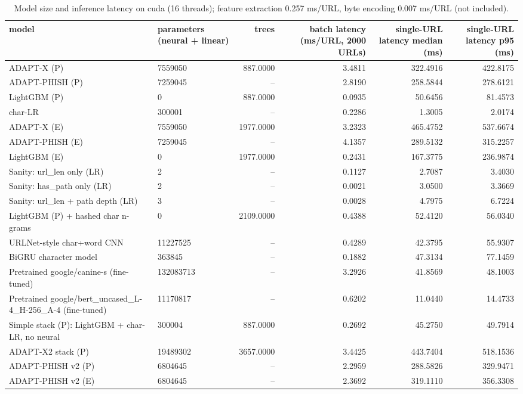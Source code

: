 \begin{table}[t]
\centering
\scriptsize
\caption{Model size and inference latency on cuda (16 threads); feature extraction 0.257 ms/URL, byte encoding 0.007 ms/URL (not included).}
\label{tab:rev_R10_computational_cost}
\begin{tabular}{llrrrr}
\toprule
model & parameters (neural + linear) & trees & batch latency (ms/URL, 2000 URLs) & single-URL latency median (ms) & single-URL latency p95 (ms) \\
\midrule
ADAPT-X (P) & 7559050 & 887.0000 & 3.4811 & 322.4916 & 422.8175 \\
ADAPT-PHISH (P) & 7259045 & -- & 2.8190 & 258.5844 & 278.6121 \\
LightGBM (P) & 0 & 887.0000 & 0.0935 & 50.6456 & 81.4573 \\
char-LR & 300001 & -- & 0.2286 & 1.3005 & 2.0174 \\
ADAPT-X (E) & 7559050 & 1977.0000 & 3.2323 & 465.4752 & 537.6674 \\
ADAPT-PHISH (E) & 7259045 & -- & 4.1357 & 289.5132 & 315.2257 \\
LightGBM (E) & 0 & 1977.0000 & 0.2431 & 167.3775 & 236.9874 \\
Sanity: url\_len only (LR) & 2 & -- & 0.1127 & 2.7087 & 3.4030 \\
Sanity: has\_path only (LR) & 2 & -- & 0.0021 & 3.0500 & 3.3669 \\
Sanity: url\_len + path depth (LR) & 3 & -- & 0.0028 & 4.7975 & 6.7224 \\
LightGBM (P) + hashed char n-grams & 0 & 2109.0000 & 0.4388 & 52.4120 & 56.0340 \\
URLNet-style char+word CNN & 11227525 & -- & 0.4289 & 42.3795 & 55.9307 \\
BiGRU character model & 363845 & -- & 0.1882 & 47.3134 & 77.1459 \\
Pretrained google/canine-s (fine-tuned) & 132083713 & -- & 3.2926 & 41.8569 & 48.1003 \\
Pretrained google/bert\_uncased\_L-4\_H-256\_A-4 (fine-tuned) & 11170817 & -- & 0.6202 & 11.0440 & 14.4733 \\
Simple stack (P): LightGBM + char-LR, no neural & 300004 & 887.0000 & 0.2692 & 45.2750 & 49.7914 \\
ADAPT-X2 stack (P) & 19489302 & 3657.0000 & 3.4425 & 443.7404 & 518.1536 \\
ADAPT-PHISH v2 (P) & 6804645 & -- & 2.2959 & 288.5826 & 329.9471 \\
ADAPT-PHISH v2 (E) & 6804645 & -- & 2.3692 & 319.1110 & 356.3308 \\

\end{tabular}
\end{table}
